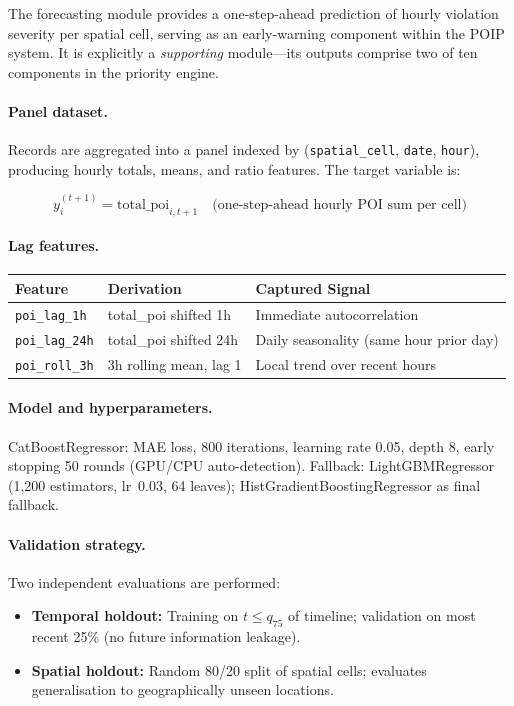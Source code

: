 \documentclass[12pt,a4paper]{article}
\begin{document}
The forecasting module provides a one-step-ahead prediction of hourly violation severity per
spatial cell, serving as an early-warning component within the POIP system. It is explicitly
a \emph{supporting} module—its outputs comprise two of ten components in the priority engine.

\paragraph{Panel dataset.}
Records are aggregated into a panel indexed by (\texttt{spatial\_cell}, \texttt{date},
\texttt{hour}), producing hourly totals, means, and ratio features. The target variable is:

\begin{equation}
y_i^{(t+1)} = \text{total\_poi}_{i,t+1}
\quad\text{(one-step-ahead hourly POI sum per cell)}
\end{equation}

\paragraph{Lag features.}

\begin{center}
\small
\begin{tabular}{@{}lll@{}}
\toprule
\textbf{Feature} & \textbf{Derivation} & \textbf{Captured Signal}\\
\midrule
\texttt{poi\_lag\_1h}   & total\_poi shifted 1h     & Immediate autocorrelation\\
\texttt{poi\_lag\_24h}  & total\_poi shifted 24h    & Daily seasonality (same hour prior day)\\
\texttt{poi\_roll\_3h}  & 3h rolling mean, lag 1    & Local trend over recent hours\\
\bottomrule
\end{tabular}
\end{center}

\paragraph{Model and hyperparameters.}
CatBoostRegressor: MAE loss, 800 iterations, learning rate 0.05, depth 8, early stopping
50 rounds (GPU/CPU auto-detection). Fallback: LightGBMRegressor (1,200 estimators,
lr~0.03, 64 leaves); HistGradientBoostingRegressor as final fallback.

\paragraph{Validation strategy.}
Two independent evaluations are performed:
\begin{itemize}
  \item \textbf{Temporal holdout:} Training on $t \le q_{75}$ of timeline; validation on
  most recent 25\% (no future information leakage).
  \item \textbf{Spatial holdout:} Random 80/20 split of spatial cells; evaluates
  generalisation to geographically unseen locations.
\end{itemize}
\end{document}
